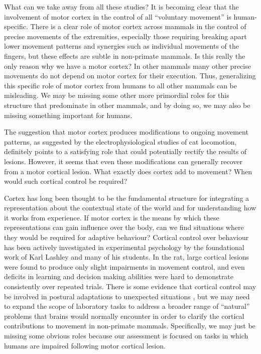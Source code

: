 What can we take away from all these studies? It is becoming clear that the involvement of motor cortex in the control of all ``voluntary movement'' is human-specific. There is a clear role of motor cortex across mammals in the control of precise movements of the extremities, especially those requiring breaking apart lower movement patterns and synergies such as individual movements of the fingers, but these effects are subtle in non-primate mammals. Is this really the only reason why we have a motor cortex? In other mammals many other precise movements do not depend on motor cortex for their execution. Thus, generalizing this specific role of motor cortex from humans to all other mammals can be misleading. We may be missing some other more primordial roles for this structure that predominate in other mammals, and by doing so, we may also be missing something important for humans.

The suggestion that motor cortex produces modifications to ongoing movement patterns, as suggested by the electrophysiological studies of cat locomotion, definitely points to a satisfying role that could potentially rectify the results of lesions. However, it seems that even these modifications can generally recover from a motor cortical lesion. What exactly does cortex add to movement? When would such cortical control be required?

Cortex has long been thought to be the fundamental structure for integrating a representation about the contextual state of the world and for understanding how it works from experience. If motor cortex is the means by which these representations can gain influence over the body, can we find situations where they would be required for adaptive behaviour? Cortical control over behaviour has been actively investigated in experimental psychology by the foundational work of Karl Lashley and many of his students. In the rat, large cortical lesions were found to produce only slight impairments in movement control, and even deficits in learning and decision making abilities were hard to demonstrate consistently over repeated trials. There is some evidence that cortical control may be involved in postural adaptations to unexpected situations \cite{Lashley1921a}, but we may need to expand the scope of laboratory tasks to address a broader range of ``natural'' problems that brains would normally encounter in order to clarify the cortical contributions to movement in non-primate mammals. Specifically, we may just be missing some obvious roles because our assessment is focused on tasks in which humans are impaired following motor cortical lesion.

